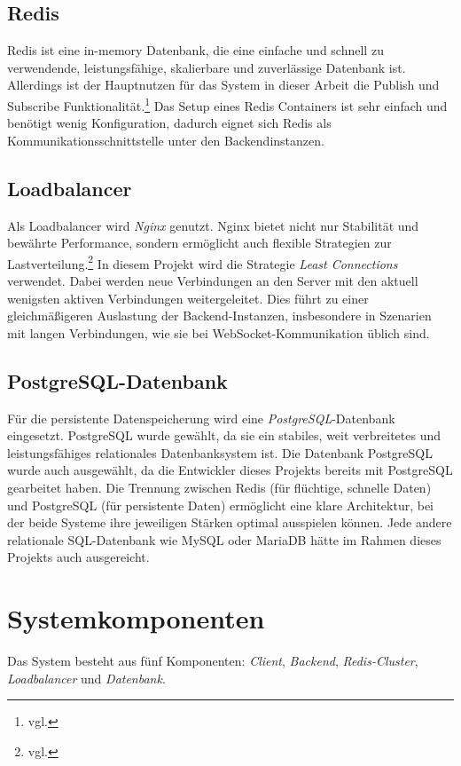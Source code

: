 \subsection{Redis}
Redis ist eine in-memory Datenbank, die eine einfache und schnell zu verwendende, leistungsfähige, skalierbare und zuverlässige Datenbank ist.
Allerdings ist der Hauptnutzen für das System in dieser Arbeit die Publish und Subscribe Funktionalität.\footnote{vgl. }
Das Setup eines Redis Containers ist sehr einfach und benötigt wenig Konfiguration, dadurch eignet sich Redis als Kommunikationsschnittstelle unter den Backendinstanzen.

\subsection{Loadbalancer}
Als Loadbalancer wird \textit{Nginx} genutzt. 
Nginx bietet nicht nur Stabilität und bewährte Performance, sondern ermöglicht auch flexible Strategien 
zur Lastverteilung.\footnote{vgl. }  
In diesem Projekt wird die Strategie \textit{Least Connections} verwendet. Dabei werden neue Verbindungen 
an den Server mit den aktuell wenigsten aktiven Verbindungen weitergeleitet.  
Dies führt zu einer gleichmäßigeren Auslastung der Backend-Instanzen, insbesondere in Szenarien mit 
langen Verbindungen, wie sie bei WebSocket-Kommunikation üblich sind.

\subsection{PostgreSQL-Datenbank}
Für die persistente Datenspeicherung wird eine \textit{PostgreSQL}-Datenbank eingesetzt.  
PostgreSQL wurde gewählt, da sie ein stabiles, weit verbreitetes und leistungsfähiges relationales Datenbanksystem ist. 
Die Datenbank PostgreSQL wurde auch ausgewählt, da die Entwickler dieses Projekts bereits mit PostgreSQL gearbeitet haben.
Die Trennung zwischen Redis (für flüchtige, schnelle Daten) und PostgreSQL (für persistente Daten) 
ermöglicht eine klare Architektur, bei der beide Systeme ihre jeweiligen Stärken optimal ausspielen können.
Jede andere relationale SQL-Datenbank wie MySQL oder MariaDB hätte im Rahmen dieses Projekts auch ausgereicht.

\section{Systemkomponenten}
Das System besteht aus fünf Komponenten: \textit{Client}, \textit{Backend}, \textit{Redis-Cluster}, \textit{Loadbalancer} und \textit{Datenbank}.

